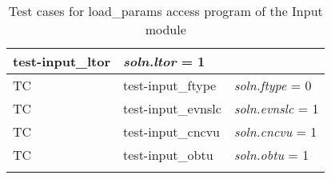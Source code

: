 \documentclass[12pt, titlepage]{article}
\newcounter{utestnum} %
\begin{document}
\begin{longtable}{  l  p{4cm}  p{6cm}  }
	test-input\_ltor &  \textit{soln.ltor} = 1\\ 
	\hline
	TC{utestnum}\theutestnum  \label{TC_InputFtype} & 
	test-input\_ftype &  \textit{soln.ftype} = 0\\ 
	\hline
	TC{utestnum}\theutestnum  \label{TC_InputEvenslc} & 
	test-input\_evnslc &  \textit{soln.evnslc} = 1\\ 
	\hline
	TC{utestnum}\theutestnum  \label{TC_InputCncvu} & 
	test-input\_cncvu &  \textit{soln.cncvu} = 1\\ 
	\hline
	TC{utestnum}\theutestnum  \label{TC_InputObtu} & 
	test-input\_obtu &  \textit{soln.obtu} = 1\\ 
	\hline
	\caption{Test cases for load\_params access program of the Input module}
	\label{InputTests}
\end{longtable}
\end{document}
